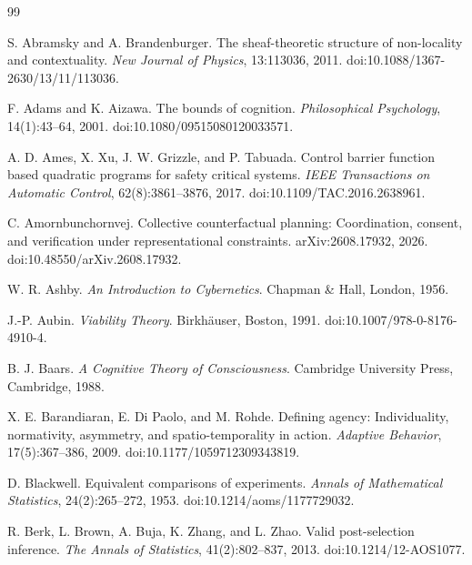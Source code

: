 \begin{thebibliography}{99}
\small

S. Abramsky and A. Brandenburger.
\newblock The sheaf-theoretic structure of non-locality and contextuality.
\newblock \emph{New Journal of Physics}, 13:113036, 2011.
\newblock doi:10.1088/1367-2630/13/11/113036.

F. Adams and K. Aizawa.
\newblock The bounds of cognition.
\newblock \emph{Philosophical Psychology}, 14(1):43--64, 2001.
\newblock doi:10.1080/09515080120033571.

A. D. Ames, X. Xu, J. W. Grizzle, and P. Tabuada.
\newblock Control barrier function based quadratic programs for safety critical systems.
\newblock \emph{IEEE Transactions on Automatic Control}, 62(8):3861--3876, 2017.
\newblock doi:10.1109/TAC.2016.2638961.

C. Amornbunchornvej.
\newblock Collective counterfactual planning: Coordination, consent, and verification under representational constraints.
\newblock arXiv:2608.17932, 2026.
\newblock doi:10.48550/arXiv.2608.17932.

W. R. Ashby.
\newblock \emph{An Introduction to Cybernetics}.
\newblock Chapman \& Hall, London, 1956.

J.-P. Aubin.
\newblock \emph{Viability Theory}.
\newblock Birkh\"auser, Boston, 1991.
\newblock doi:10.1007/978-0-8176-4910-4.

B. J. Baars.
\newblock \emph{A Cognitive Theory of Consciousness}.
\newblock Cambridge University Press, Cambridge, 1988.

X. E. Barandiaran, E. Di Paolo, and M. Rohde.
\newblock Defining agency: Individuality, normativity, asymmetry, and spatio-temporality in action.
\newblock \emph{Adaptive Behavior}, 17(5):367--386, 2009.
\newblock doi:10.1177/1059712309343819.

D. Blackwell.
\newblock Equivalent comparisons of experiments.
\newblock \emph{Annals of Mathematical Statistics}, 24(2):265--272, 1953.
\newblock doi:10.1214/aoms/1177729032.


R. Berk, L. Brown, A. Buja, K. Zhang, and L. Zhao.
\newblock Valid post-selection inference.
\newblock \emph{The Annals of Statistics}, 41(2):802--837, 2013.
\newblock doi:10.1214/12-AOS1077.


\end{thebibliography}
